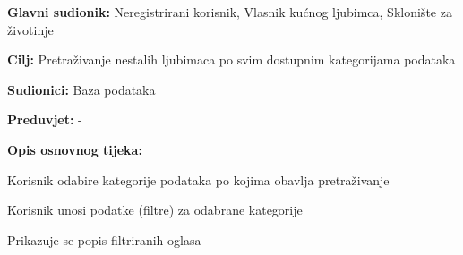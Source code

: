 					\noindent {}
					\begin{packed_item}
						
						\item \textbf{Glavni sudionik: }Neregistrirani korisnik, Vlasnik kućnog ljubimca, Sklonište za životinje
						\item  \textbf{Cilj:} Pretraživanje nestalih ljubimaca po svim dostupnim kategorijama podataka
						\item  \textbf{Sudionici:} Baza podataka
						\item  \textbf{Preduvjet:} -
						\item  \textbf{Opis osnovnog tijeka:}
						
						\item[] \begin{packed_enum}
							
							\item Korisnik odabire kategorije podataka po kojima obavlja pretraživanje
							\item Korisnik unosi podatke (filtre) za odabrane kategorije
							\item Prikazuje se popis filtriranih oglasa
						\end{packed_enum}
					\end{packed_item}
					
